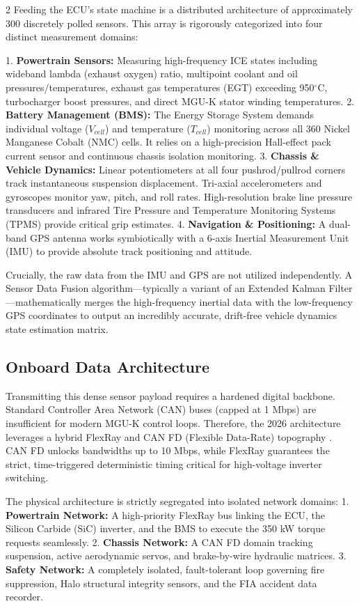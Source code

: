 \begin{multicols}{2}
Feeding the ECU's state machine is a distributed architecture of approximately 300 discretely polled sensors. This array is rigorously categorized into four distinct measurement domains:

1. \textbf{Powertrain Sensors:} Measuring high-frequency ICE states including wideband lambda (exhaust oxygen) ratio, multipoint coolant and oil pressures/temperatures, exhaust gas temperatures (EGT) exceeding 950$^\circ$C, turbocharger boost pressures, and direct MGU-K stator winding temperatures.
2. \textbf{Battery Management (BMS):} The Energy Storage System demands individual voltage ($V_{cell}$) and temperature ($T_{cell}$) monitoring across all 360 Nickel Manganese Cobalt (NMC) cells. It relies on a high-precision Hall-effect pack current sensor and continuous chassis isolation monitoring.
3. \textbf{Chassis \& Vehicle Dynamics:} Linear potentiometers at all four pushrod/pullrod corners track instantaneous suspension displacement. Tri-axial accelerometers and gyroscopes monitor yaw, pitch, and roll rates. High-resolution brake line pressure transducers and infrared Tire Pressure and Temperature Monitoring Systems (TPMS) provide critical grip estimates.
4. \textbf{Navigation \& Positioning:} A dual-band GPS antenna works symbiotically with a 6-axis Inertial Measurement Unit (IMU) to provide absolute track positioning and attitude.

Crucially, the raw data from the IMU and GPS are not utilized independently. A Sensor Data Fusion algorithm—typically a variant of an Extended Kalman Filter—mathematically merges the high-frequency inertial data with the low-frequency GPS coordinates to output an incredibly accurate, drift-free vehicle dynamics state estimation matrix.

\subsection{Onboard Data Architecture}

Transmitting this dense sensor payload requires a hardened digital backbone. Standard Controller Area Network (CAN) buses (capped at 1 Mbps) are insufficient for modern MGU-K control loops. Therefore, the 2026 architecture leverages a hybrid FlexRay and CAN FD (Flexible Data-Rate) topography \cite{automotive_networks_lit}. CAN FD unlocks bandwidths up to 10 Mbps, while FlexRay guarantees the strict, time-triggered deterministic timing critical for high-voltage inverter switching.

The physical architecture is strictly segregated into isolated network domains:
1. \textbf{Powertrain Network:} A high-priority FlexRay bus linking the ECU, the Silicon Carbide (SiC) inverter, and the BMS to execute the 350 kW torque requests seamlessly.
2. \textbf{Chassis Network:} A CAN FD domain tracking suspension, active aerodynamic servos, and brake-by-wire hydraulic matrices.
3. \textbf{Safety Network:} A completely isolated, fault-tolerant loop governing fire suppression, Halo structural integrity sensors, and the FIA accident data recorder. 


\end{multicols}
